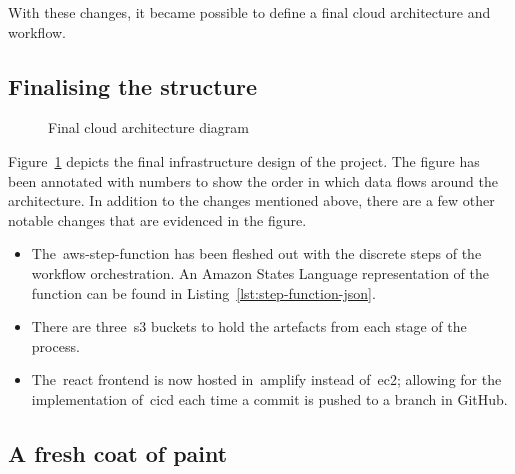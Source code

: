With these changes, it became possible to define a final cloud architecture and workflow.

\subsection{Finalising the structure}\label{subsec:finalising-the-structure}

\begin{figure}[!htb]
    \minipage{\textwidth}
    
    \caption{Final cloud architecture diagram}\label{fig:final_design}
    \endminipage\hfill
\end{figure}

Figure~\ref{fig:final_design} depicts the final infrastructure design of the project.
The figure has been annotated with numbers to show the order in which data flows around the architecture.
In addition to the changes mentioned above, there are a few other notable changes that are evidenced in the figure.

\begin{itemize}
    \item The~\gls{aws-step-function} has been fleshed out with the discrete steps of the workflow orchestration.
    An Amazon States Language representation of the function can be found in Listing~\ref{lst:step-function-json}.
    \item There are three~\gls{s3} buckets to hold the artefacts from each stage of the process.
    \item The~\gls{react} frontend is now hosted in~\gls{amplify} instead of~\gls{ec2}; allowing for the implementation of~\gls{cicd} each time a commit is pushed to a branch in GitHub.
\end{itemize}

\subsection{A fresh coat of paint}\label{subsec:a-fresh-coat-of-paint}


